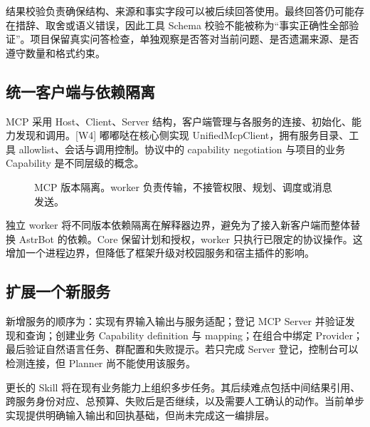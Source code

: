 结果校验负责确保结构、来源和事实字段可以被后续回答使用。最终回答仍可能存在措辞、取舍或语义错误，因此工具 Schema 校验不能被称为“事实正确性全部验证”。项目保留真实问答检查，单独观察是否答对当前问题、是否遗漏来源、是否遵守数量和格式约束。

\subsection{统一客户端与依赖隔离}
MCP 采用 Host、Client、Server 结构，客户端管理与各服务的连接、初始化、能力发现和调用。[W4] 嘟嘟哒在核心侧实现 UnifiedMcpClient，拥有服务目录、工具 allowlist、会话与调用控制。协议中的 capability negotiation 与项目的业务 Capability 是不同层级的概念。

\begin{figure}[H]\centering
{}
\caption{MCP 版本隔离。worker 负责传输，不接管权限、规划、调度或消息发送。}
\end{figure}

独立 worker 将不同版本依赖隔离在解释器边界，避免为了接入新客户端而整体替换 AstrBot 的依赖。Core 保留计划和授权，worker 只执行已限定的协议操作。这增加一个进程边界，但降低了框架升级对校园服务和宿主插件的影响。

\subsection{扩展一个新服务}
新增服务的顺序为：实现有界输入输出与服务适配；登记 MCP Server 并验证发现和查询；创建业务 Capability definition 与 mapping；在组合中绑定 Provider；最后验证自然语言任务、群配置和失败提示。若只完成 Server 登记，控制台可以检测连接，但 Planner 尚不能使用该服务。

更长的 Skill 将在现有业务能力上组织多步任务。其后续难点包括中间结果引用、跨服务身份对应、总预算、失败后是否继续，以及需要人工确认的动作。当前单步实现提供明确输入输出和回执基础，但尚未完成这一编排层。
